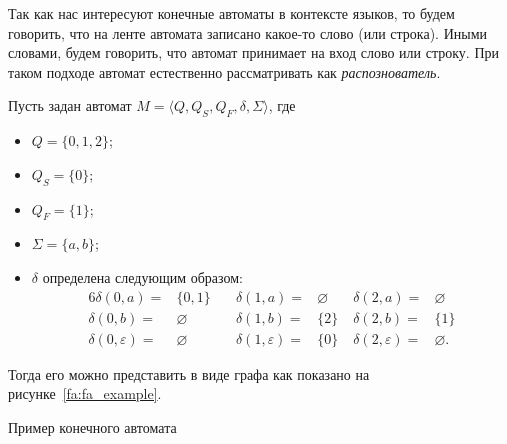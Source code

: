 Так как нас интересуют конечные автоматы в контексте языков, то будем говорить, что на ленте автомата записано какое-то слово (или строка).
Иными словами, будем говорить, что автомат принимает на вход слово или строку.
При таком подходе автомат естественно рассматривать как \emph{распознователь}.

\begin{example}
    Пусть задан автомат $M=\langle Q, Q_S, Q_F, \delta, \Sigma\rangle$, где
    \begin{itemize}
        \item $Q = \{0,1,2\}$;
        \item $Q_S = \{0\}$;
        \item $Q_F = \{1\}$;
        \item $\Sigma = \{a,b\}$;
        \item $\delta$ определена следующим образом: 
        \begin{alignat*}{6}
            \delta(0,a) =& \{0,1\}      \quad    & \delta(1,a) =& \varnothing \quad & \delta(2,a) =& \varnothing \\
            \delta(0,b) =& \varnothing           & \delta(1,b) =& \{2\}             & \delta(2,b) =& \{1\} \\
            \delta(0,\varepsilon) =& \varnothing & \delta(1,\varepsilon) =& \{0\}   & \delta(2,\varepsilon) =& \varnothing.
        \end{alignat*}
    \end{itemize}
    Тогда его можно представить в виде графа как показано на рисунке~\ref{fa:fa_example}.
    \begin{marginfigure}    
        \begin{center}
        \end{center}
        \caption{Пример конечного автомата}
        \label{fa:fa_example}
    \end{marginfigure}
\end{example}


